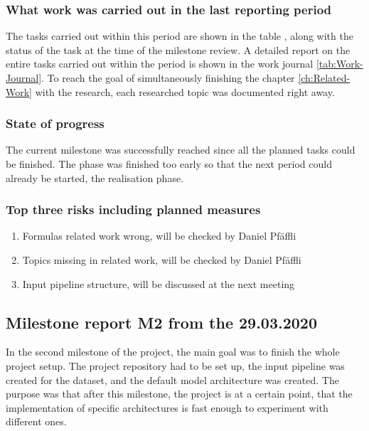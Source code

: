 \subsubsection{What work was carried out in the last reporting period}
The tasks carried out within this period are shown in the table , along with the status of the task at the time of the milestone review. A detailed report on the entire tasks carried out within the period is shown in the work journal \ref{tab:Work-Journal}. To reach the goal of simultaneously finishing the chapter \ref{ch:Related-Work} with the research, each researched topic was documented right away. 

\subsubsection{State of progress}
The current milestone was successfully reached since all the planned tasks could be finished. The phase was finished too early so that the next period could already be started, the realisation phase. 

\subsubsection{Top three risks including planned measures}
\begin{enumerate}
    \setlength\itemsep{0em}
    \item Formulas related work wrong, will be checked by Daniel Pfäffli
    \item Topics missing in related work, will be checked by Daniel Pfäffli
    \item Input pipeline structure, will be discussed at the next meeting
\end{enumerate}

\subsection{Milestone report M2 from the 29.03.2020}
In the second milestone of the project, the main goal was to finish the whole project setup. The project repository had to be set up, the input pipeline was created for the dataset, and the default model architecture was created. The purpose was that after this milestone, the project is at a certain point, that the implementation of specific architectures is fast enough to experiment with different ones.

